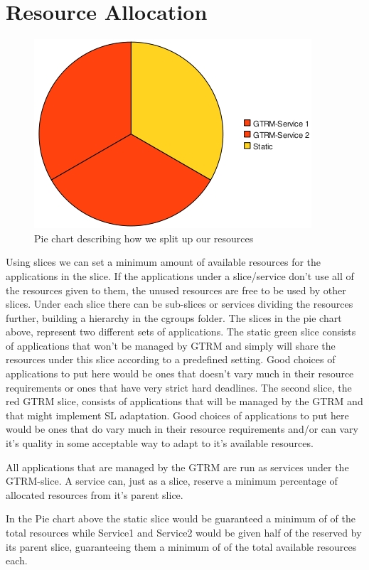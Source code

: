 \documentclass[nobiblatex]{LTHthesis}
\begin{document}
\section{Resource Allocation}
\begin{figure}
    \centering
    \includegraphics{piechart.jpeg}
    \caption{Pie chart describing how we split up our resources}
    \label{fig:Piechart}
\end{figure}
Using slices we can set a minimum amount of available resources for the applications in the slice. If the applications under a slice/service don’t use all of the resources given to them, the unused resources are free to be used by other slices. Under each slice there can be sub-slices or services dividing the resources further, building a hierarchy in the cgroups folder. The slices in the pie chart above, represent two different sets of applications. The static green slice consists of applications that won’t be managed by GTRM and simply will share the resources under this slice according to a predefined setting. Good choices of applications to put here would be ones that doesn’t vary much in their resource requirements or ones that have very strict hard deadlines. The second slice, the red GTRM slice, consists of applications that will be managed by the GTRM and that might implement SL adaptation. Good choices of applications to put here would be ones that do vary much in their resource requirements and/or can vary it’s quality in some acceptable way to adapt to it’s available resources.

All applications that are managed by the GTRM are run as services under the GTRM-slice. A service can, just as a slice, reserve a minimum percentage of allocated resources from it’s parent slice.

In the Pie chart above the static slice would be guaranteed a minimum of  of the total resources while Service1 and Service2 would be given half of the  reserved by its parent slice, guaranteeing  them a minimum of  of the total available resources each.
\end{document}
